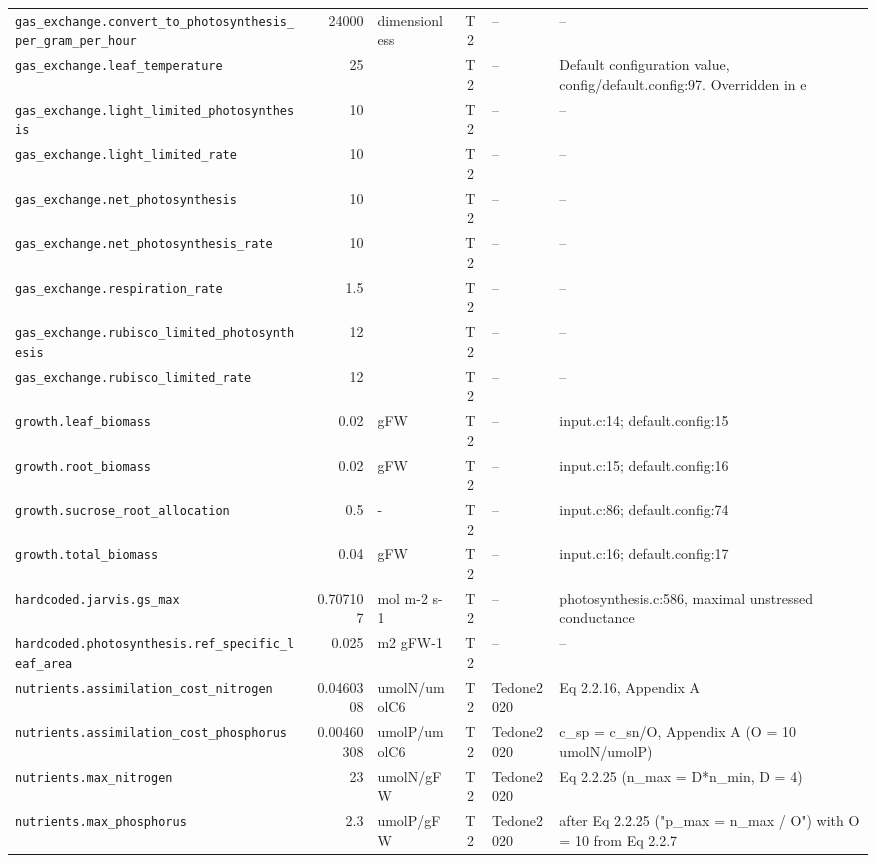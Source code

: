 \documentclass[a4paper,11pt]{article}
\begin{document}
\begin{table}[!htbp]
\begin{tabular}{@{}p{52mm}rp{20mm}cp{20mm}p{38mm}@{}}
\texttt{gas\_exchange.convert\_to\_photosynthesis\_per\_gram\_per\_hour} & 24000 & dimensionless & T2 & -- & -- \\
\texttt{gas\_exchange.leaf\_temperature} & 25 &  & T2 & -- & Default configuration value, config/default.config:97. Overridden in e \\
\texttt{gas\_exchange.light\_limited\_photosynthesis} & 10 &  & T2 & -- & -- \\
\texttt{gas\_exchange.light\_limited\_rate} & 10 &  & T2 & -- & -- \\
\texttt{gas\_exchange.net\_photosynthesis} & 10 &  & T2 & -- & -- \\
\texttt{gas\_exchange.net\_photosynthesis\_rate} & 10 &  & T2 & -- & -- \\
\texttt{gas\_exchange.respiration\_rate} & 1.5 &  & T2 & -- & -- \\
\texttt{gas\_exchange.rubisco\_limited\_photosynthesis} & 12 &  & T2 & -- & -- \\
\texttt{gas\_exchange.rubisco\_limited\_rate} & 12 &  & T2 & -- & -- \\
\texttt{growth.leaf\_biomass} & 0.02 & gFW & T2 & -- & input.c:14; default.config:15 \\
\texttt{growth.root\_biomass} & 0.02 & gFW & T2 & -- & input.c:15; default.config:16 \\
\texttt{growth.sucrose\_root\_allocation} & 0.5 & - & T2 & -- & input.c:86; default.config:74 \\
\texttt{growth.total\_biomass} & 0.04 & gFW & T2 & -- & input.c:16; default.config:17 \\
\texttt{hardcoded.jarvis.gs\_max} & 0.707107 & mol m-2 s-1 & T2 & -- & photosynthesis.c:586, maximal unstressed conductance \\
\texttt{hardcoded.photosynthesis.ref\_specific\_leaf\_area} & 0.025 & m2 gFW-1 & T2 & -- & -- \\
\texttt{nutrients.assimilation\_cost\_nitrogen} & 0.0460308 & umolN/umolC6 & T2 & Tedone2020 & Eq 2.2.16, Appendix A \\
\texttt{nutrients.assimilation\_cost\_phosphorus} & 0.00460308 & umolP/umolC6 & T2 & Tedone2020 & c\_sp = c\_sn/O, Appendix A (O = 10 umolN/umolP) \\
\texttt{nutrients.max\_nitrogen} & 23 & umolN/gFW & T2 & Tedone2020 & Eq 2.2.25 (n\_max = D*n\_min, D = 4) \\
\texttt{nutrients.max\_phosphorus} & 2.3 & umolP/gFW & T2 & Tedone2020 & after Eq 2.2.25 ("p\_max = n\_max / O") with O = 10 from Eq 2.2.7 \\

\end{tabular}
\end{table}
\end{document}
